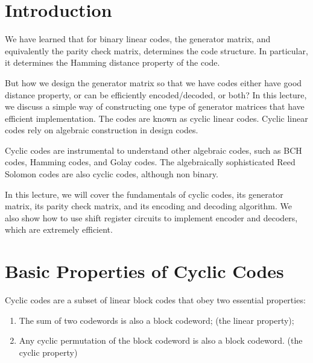 \Contributor{}

\lstset{style=mystyle}

	\MakeScribeTop


\section{Introduction}
We have learned that for binary linear codes, the generator matrix, and equivalently the parity check matrix, determines the code structure. In particular, it determines the Hamming distance property of the code. 

But how we design the generator matrix so that we have codes either have good distance property, or can be efficiently encoded/decoded, or both? In this lecture, we discuss a simple way of constructing one type of generator matrices that have efficient implementation. The codes are known as cyclic linear codes. Cyclic linear codes rely on algebraic construction in design codes. 


Cyclic codes are instrumental to understand other algebraic codes, such as BCH codes, Hamming codes, and Golay codes. The algebraically sophisticated Reed Solomon codes are also cyclic codes, although non binary. 

In this lecture, we will cover the fundamentals of cyclic codes, its generator matrix, its parity check matrix, and its encoding and decoding algorithm. We also show how to use shift register circuits to implement encoder and decoders, which are extremely efficient.  

\section{Basic Properties of Cyclic Codes}
\begin{definition}
Cyclic codes are a subset of linear block codes that obey two essential properties: 
\begin{enumerate}
    \item The sum of two codewords is also a block  codeword; (the linear property); 
    \item Any cyclic permutation of the block codeword is also a block codeword. (the cyclic property)
\end{enumerate}
    
\end{definition}

